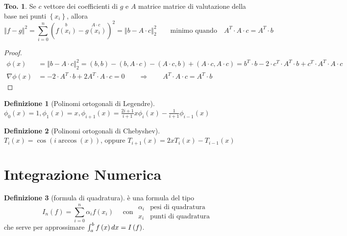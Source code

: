 \documentclass[a4paper,10pt]{article}
\theoremstyle{definition}
\theoremstyle{indentdefinition}
\newtheorem{defn}{Definizione}[section]
\theoremstyle{indenttheorem}
\newtheorem{thm}{Teo.}
\theoremstyle{myremark}
\theoremstyle{indentgeneral}
\theoremstyle{plain}
\theoremstyle{plain}
\begin{document}
\begin{thm}
Se $c$ vettore dei coefficienti di $g$ e $A$ matrice matrice di
valutazione della base nei punti $\left\{ x_{i}\right\} $, allora
\[
\left\Vert f-g\right\Vert ^{2}=\sum_{i=0}^{n}\left(\overset{b}{f\left(x_{i}\right)}-\overset{A\cdot c}{g\left(x_{i}\right)}\right)^{2}=\left\Vert b-A\cdot c\right\Vert _{2}^{2}\qquad\text{minimo quando}\quad A^{T}\cdot A\cdot c=A^{T}\cdot b
\]
\end{thm}

\begin{proof}
\begin{align*}
\phi\left(x\right) & =\left\Vert b-A\cdot c\right\Vert _{2}^{2}=\left(b,b\right)-\left(b,A\cdot c\right)-\left(A\cdot c,b\right)+\left(A\cdot c,A\cdot c\right)=b^{T}\cdot b-2\cdot c^{T}\cdot A^{T}\cdot b+c^{T}\cdot A^{T}\cdot A\cdot c\\
\nabla\phi\left(x\right) & =-2\cdot A^{T}\cdot b+2A^{T}\cdot A\cdot c=0\qquad\Longrightarrow\qquad A^{T}\cdot A\cdot c=A^{T}\cdot b
\end{align*}
\end{proof}
\begin{defn}[Polinomi ortogonali di Legendre]
$\phi_{0}\left(x\right)=1,\phi_{1}\left(x\right)=x,\phi_{i+1}\left(x\right)=\frac{2i+1}{i+1}x\phi_{i}\left(x\right)-\frac{1}{i+1}\phi_{i-1}\left(x\right)$
\end{defn}

\begin{defn}[Polinomi ortogonali di Chebyshev]
$T_{i}\left(x\right)=\cos\left(i\arccos\left(x\right)\right)$, oppure
$T_{i+1}\left(x\right)=2xT_{i}\left(x\right)-T_{i-1}\left(x\right)$
\end{defn}







\pagebreak{}

\section{Integrazione Numerica}
\begin{defn}[formula di quadratura]
\label{def:formula-di-quadratura} è una formula del tipo
$$I_{n}\left(f\right)=\sum_{i=0}^{n}\alpha_{i}f\left(x_{i}\right)\quad\text{ con }\begin{array}{ll}
\alpha_{i} & \text{pesi di quadratura}\\
x_{i} & \text{punti di quadratura}
\end{array}$$
che serve per approssimare $\intop_{a}^{b}f\left(x\right)dx=I\left(f\right)$.
\end{defn}
\end{document}
